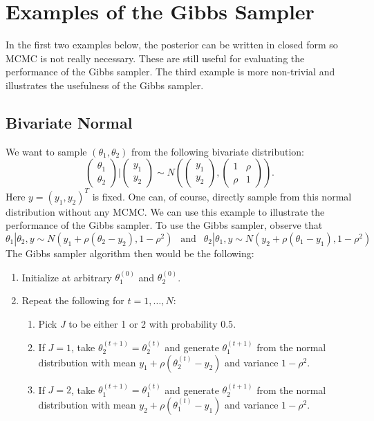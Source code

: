 \documentclass{scrartcl}
\begin{document}
\section{Examples of the Gibbs Sampler}

In the first two examples below, the posterior can be written in
closed form so MCMC is not really necessary. These are still useful
for evaluating the performance of the Gibbs sampler. The third
example is more non-trivial and illustrates the usefulness of the
Gibbs sampler.    

\subsection{Bivariate Normal}
We want to sample $(\theta_1, \theta_2)$ from the following bivariate
distribution: 
  \begin{equation*}
    \begin{pmatrix} \theta_1 \\ \theta_2 \end{pmatrix}
    \Biggr| \begin{pmatrix}y_1 \\ y_2 \end{pmatrix} \sim N
    \left(\begin{pmatrix}y_1 \\ y_2 \end{pmatrix}, \begin{pmatrix} 1 & \rho \\ \rho &
    1 \end{pmatrix} \right). 
\end{equation*}
Here $y = (y_1, y_2)^T$ is fixed. One can, of course, directly sample from
this normal distribution without any MCMC. We can use this example to
illustrate the performance of the Gibbs sampler. To use the Gibbs
sampler, observe that  
  \begin{equation*}
    \theta_1 | \theta_2, y \sim N(y_1 + \rho(\theta_2 - y_2), 1 -
    \rho^2) ~~ \text{ and } ~~ \theta_2 | \theta_1, y \sim N(y_2 + \rho(\theta_1 - y_1), 1 -
    \rho^2)
  \end{equation*}
  The Gibbs sampler algorithm then would be the following:
  \begin{enumerate}
  \item Initialize at arbitrary $\theta_1^{(0)}$ and
    $\theta_2^{(0)}$.
  \item Repeat the following for $t = 1, \dots, N$: 
    \begin{enumerate}
    \item Pick $J$ to be either 1 or 2 with probability $0.5$.
     \item If $J = 1$, take $\theta_2^{(t+1)} = \theta_2^{(t)}$ and
       generate $\theta_1^{(t+1)}$ from the normal distribution with
       mean $y_1 + \rho (\theta_2^{(t)} - y_2)$ and variance $1 -
       \rho^2$.
      \item   If $J = 2$, take $\theta_1^{(t+1)} = \theta_1^{(t)}$ and
       generate $\theta_2^{(t+1)}$ from the normal distribution with
       mean $y_2 + \rho (\theta_1^{(t)} - y_1)$ and variance $1 -
       \rho^2$.
    \end{enumerate}
  \end{enumerate}
\end{document}
